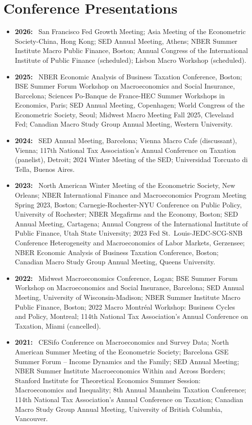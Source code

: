 \documentclass[letterpaper]{article}
\newcommand{\yr}[1]{\textbf{#1:}\ }
\begin{document}
\section*{Conference Presentations}
\begin{itemize}
\item \yr{2026} San Francisco Fed Growth Meeting; Asia Meeting of the Econometric Society-China, Hong Kong; SED Annual Meeting, Athens; NBER Summer Institute Macro Public Finance, Boston; Annual Congress of the International Institute of Public Finance (scheduled); Lisbon Macro Workshop (scheduled).
\item \yr{2025} NBER Economic Analysis of Business Taxation Conference, Boston; BSE Summer Forum Workshop on Macroeconomics and Social Insurance, Barcelona; Sciences Po-Banque de France-HEC Summer Workshops in Economics, Paris; SED Annual Meeting, Copenhagen; World Congress of the Econometric Society, Seoul; Midwest Macro Meeting Fall 2025, Cleveland Fed; Canadian Macro Study Group Annual Meeting, Western University.
\item \yr{2024} SED Annual Meeting, Barcelona; Vienna Macro Cafe (discussant), Vienna; 117th National Tax Association's Annual Conference on Taxation (panelist), Detroit; 2024 Winter Meeting of the SED; Universidad Torcuato di Tella, Buenos Aires.
\item \yr{2023} North American Winter Meeting of the Econometric Society, New Orleans; NBER International Finance and Macroeconomics Program Meeting Spring 2023, Boston; Carnegie-Rochester-NYU Conference on Public Policy, University of Rochester; NBER Megafirms and the Economy, Boston; SED Annual Meeting, Cartagena; Annual Congress of the International Institute of Public Finance, Utah State University; 2023 Fed St.\ Louis-JEDC-SCG-SNB Conference Heterogeneity and Macroeconomics of Labor Markets, Gerzensee; NBER Economic Analysis of Business Taxation Conference, Boston; Canadian Macro Study Group Annual Meeting, Queens University.
\item \yr{2022} Midwest Macroeconomics Conference, Logan; BSE Summer Forum Workshop on Macroeconomics and Social Insurance, Barcelona; SED Annual Meeting, University of Wisconsin-Madison; NBER Summer Institute Macro Public Finance, Boston; 2022 Macro Montr\'eal Workshop: Business Cycles and Policy, Montreal; 114th National Tax Association's Annual Conference on Taxation, Miami (cancelled).
\item \yr{2021} CESifo Conference on Macroeconomics and Survey Data; North American Summer Meeting of the Econometric Society; Barcelona GSE Summer Forum -- Income Dynamics and the Family; SED Annual Meeting; NBER Summer Institute Macroeconomics Within and Across Borders; Stanford Institute for Theoretical Economics Summer Session: Macroeconomics and Inequality; 8th Annual Mannheim Taxation Conference; 114th National Tax Association's Annual Conference on Taxation; Canadian Macro Study Group Annual Meeting, University of British Columbia, Vancouver.

\end{itemize}
\end{document}
